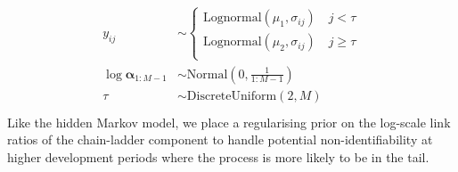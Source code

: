 \begin{align}
\begin{split}
	y_{ij} &\sim 
	\begin{cases}
		\mathrm{Lognormal}(\mu_{1}, \sigma_{ij}) \quad j < \tau\\
		\mathrm{Lognormal}(\mu_{2}, \sigma_{ij}) \quad j \geq \tau\\
	\end{cases}\\
    \log \bm{\alpha}_{1:M - 1} &\sim \mathrm{Normal}(0, \scriptstyle{\frac{1}{1:M-1}})\\
    \tau &\sim \mathrm{DiscreteUniform}(2, M)\\
\end{split}
\end{align}
%
Like the hidden Markov model, we place a regularising
prior on the log-scale link ratios of the chain-ladder
component to handle potential non-identifiability
at higher development periods where the process
is more likely to be in the tail.
